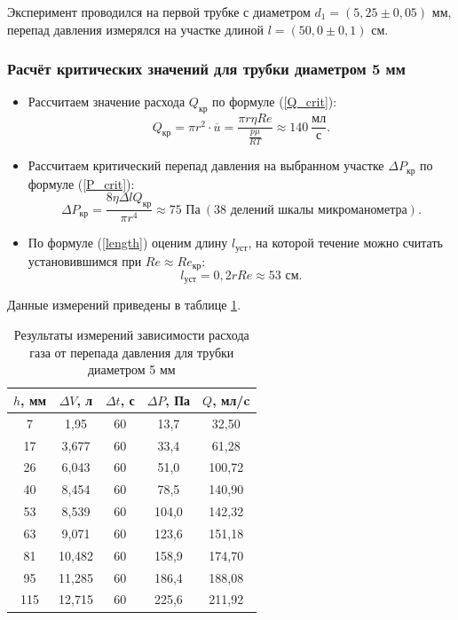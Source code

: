 \documentclass[a4paper, 12pt]{article}
\begin{document}
    \noindent Эксперимент проводился на первой трубке с диаметром $d_1 = \left( 5,25 \pm 0,05 \right)$ мм, перепад давления измерялся на участке длиной $l = \left(50,0 \pm 0,1 \right)$ см. 

    \subsubsection*{Расчёт критических значений для трубки диаметром 5 мм}

    \begin{itemize}
        \item Рассчитаем значение расхода $Q_{\text{кр}}$ по формуле (\ref{Q_crit}): \[Q_{\text{кр}} = \pi r^2 \cdot \overline{u} = \frac{\pi r \eta Re}{\frac{p \mu}{RT}} \approx 140 \: \frac{\text{мл}}{\text{с}}. \] 
        
        \item  Рассчитаем критический перепад давления на выбранном участке $\Delta P_{\text{кр}}$ по формуле (\ref{P_crit}): \[ \Delta P_{\text{кр}} = \frac{8 \eta \Delta l Q_\text{кр}}{\pi r^4} \approx 75 \text{ Па} \: (38 \text{ делений шкалы микроманометра}). \]

        \item По формуле (\ref{length}) оценим длину $l_\text{уст}$, на которой течение можно считать установившимся при $Re \approx Re_\text{кр}$: \[ l_{\text{уст}} = 0,2 r Re \approx 53 \text{ см}. \]
 
    \end{itemize}
    
    \noindent Данные измерений приведены в таблице \ref{tab:q(p)_5mm}.

    \begin{table}[H]
        \centering
        \begin{tabular}{|c|c|c|c|c|}
            \hline
            $h$, мм & $\Delta V$, л & $\Delta t$, с & $\Delta P$, Па & $Q$, мл/c \\ \hline
            7 & 1,95 & 60 & 13,7 & 32,50        \\ \hline
            17 & 3,677 & 60 & 33,4 & 61,28      \\ \hline
            26 & 6,043 & 60 & 51,0 & 100,72     \\ \hline
            40 & 8,454 & 60 & 78,5 & 140,90     \\ \hline
            53 & 8,539 & 60 & 104,0 & 142,32    \\ \hline
            63 & 9,071 & 60 & 123,6 & 151,18    \\ \hline
            81 & 10,482 & 60 & 158,9 & 174,70   \\ \hline
            95 & 11,285 & 60 & 186,4 & 188,08   \\ \hline
            115 & 12,715 & 60 & 225,6 & 211,92  \\ \hline
        \end{tabular}
        \caption{Результаты измерений зависимости расхода газа от перепада давления для трубки диаметром 5 мм}
        \label{tab:q(p)_5mm}
    \end{table}
\end{document}
